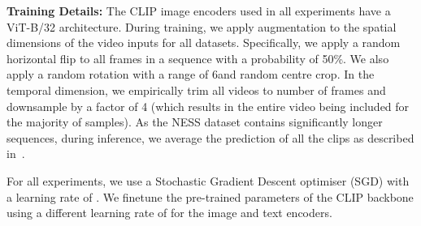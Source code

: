 \documentclass[10pt,twocolumn,letterpaper]{article}
\begin{document}
\textbf{Training Details:} The CLIP image encoders used in all experiments have a ViT-B/32 architecture. During training, we apply augmentation to the spatial dimensions of the video inputs for all datasets. Specifically, we apply a random horizontal flip to all frames in a sequence with a probability of 50\%. We also apply a random rotation with a range of 6\textdegree and random centre crop. 
In the temporal dimension, we empirically trim all videos to  number of frames and downsample by a factor of 4 (which results in the entire video being included for the majority of samples). As the NESS dataset contains significantly longer sequences, during inference, we average the prediction of all the clips as described in~\cite{foteinopoulou_learning_2022}.

For all experiments, we use a Stochastic Gradient Descent optimiser (SGD) with a learning rate of . We finetune the pre-trained parameters of the CLIP backbone using a different learning rate of  for the image and text encoders.
\end{document}
